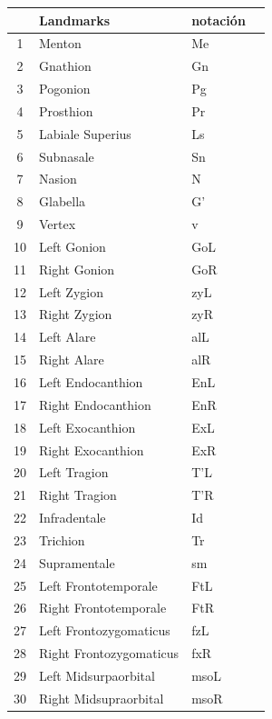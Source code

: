 \begin{center}
    \begin{tabular}{ |c|l|l|c| } 
        \hline
         & \textbf{Landmarks} & \textbf{notación} \\
        \hline
        1 & Menton & Me \\ 
        2 & Gnathion & Gn \\ 
        3 & Pogonion & Pg \\ 
        4 & Prosthion & Pr \\ 
        5 & Labiale Superius & Ls \\ 
        6 & Subnasale & Sn \\ 
        7 & Nasion & N \\ 
        8 & Glabella & G’ \\ 
        9 & Vertex & v \\ 
        10 & Left Gonion & GoL \\ 
        11 & Right Gonion & GoR\\ 
        12 & Left Zygion & zyL \\ 
        13 & Right Zygion & zyR\\ 
        14 & Left Alare & alL \\ 
        15 & Right Alare & alR \\ 
        16 & Left Endocanthion & EnL \\ 
        17 & Right Endocanthion & EnR \\ 
        18 & Left Exocanthion & ExL \\ 
        19 & Right Exocanthion & ExR \\ 
        20 & Left Tragion & T’L \\ 
        21 & Right Tragion & T’R \\ 
        22 & Infradentale & Id \\ 
        23 & Trichion & Tr \\ 
        24 & Supramentale & sm\\ 
        25 & Left Frontotemporale & FtL \\ 
        26 & Right Frontotemporale & FtR \\ 
        27 & Left Frontozygomaticus & fzL \\ 
        28 & Right Frontozygomaticus & fxR \\ 
        29 & Left Midsurpaorbital & msoL \\ 
        30 & Right Midsupraorbital & msoR \\ 
        \hline
    \end{tabular}
\end{center}

